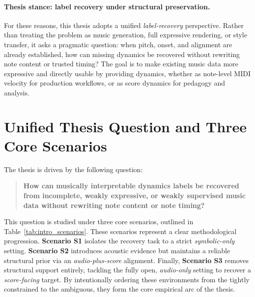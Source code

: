 \paragraph{Thesis stance: label recovery under structural preservation.}
For these reasons, this thesis adopts a unified \emph{label-recovery} perspective. Rather than treating the problem as music generation, full expressive rendering, or style transfer, it asks a pragmatic question: when pitch, onset, and alignment are already established, how can missing dynamics be recovered without rewriting note content or trusted timing? The goal is to make existing music data more expressive and directly usable by providing dynamics, whether as note-level MIDI velocity for production workflows, or as score dynamics for pedagogy and analysis.

\section{Unified Thesis Question and Three Core Scenarios}
\label{sec:intro:question}

The thesis is driven by the following question:
\begin{quote}
\textbf{How can musically interpretable dynamics labels be recovered from incomplete, weakly expressive, or weakly supervised music data without rewriting note content or note timing?}
\end{quote}
This question is studied under three core scenarios, outlined in Table~\ref{tab:intro_scenarios}. These scenarios represent a clear methodological progression. \textbf{Scenario S1} isolates the recovery task to a strict \textit{symbolic-only} setting. \textbf{Scenario S2} introduces acoustic evidence but maintains a reliable structural prior via an \textit{audio-plus-score} alignment. Finally, \textbf{Scenario S3} removes structural support entirely, tackling the fully open, \textit{audio-only} setting to recover a \textit{score-facing} target. By intentionally ordering these environments from the tightly constrained to the ambiguous, they form the core empirical arc of the thesis.

